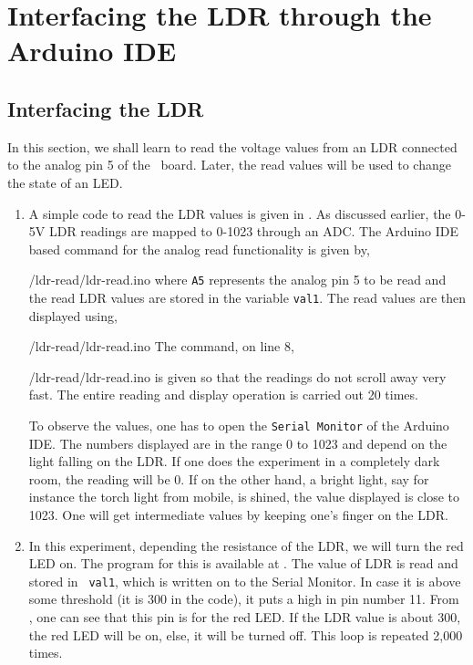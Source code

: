 \section{Interfacing the LDR through the Arduino IDE}
\subsection{Interfacing the LDR}
In this section, we shall learn to read the voltage values from an LDR
connected to the analog pin 5 of the \arduino\ board. Later, the read
values will be used to change the state of an LED.   
\begin{enumerate}
\item A simple code to read the LDR values is given in
  . As discussed earlier, the 0-5V LDR readings
  are mapped to 0-1023 through an ADC. The 
  Arduino IDE
  based command for the analog read functionality is given by,
  
  {\LocLDRardcode/ldr-read/ldr-read.ino} where {\tt A5} represents the
  analog pin 5 to be read and the read LDR values are stored in the
  variable {\tt val1}.  The read values are then displayed using,
  
  {\LocLDRardcode/ldr-read/ldr-read.ino} The command, on line 8,
  
  {\LocLDRardcode/ldr-read/ldr-read.ino} is given so that the readings
  do not scroll away very fast.  The entire reading and display
  operation is carried out 20 times.

  To observe the values, one has to open the {\tt Serial Monitor} of
  the Arduino IDE.  The numbers displayed are in the range 0 to 1023
  and depend on the light falling on the LDR.  If one does the
  experiment in a completely dark room, the reading will be 0.  If on
  the other hand, a bright light, say for instance the torch light
  from mobile, is shined, the value displayed is close to 1023.  One
  will get intermediate values by keeping one's finger on the LDR.

\item In this experiment, depending the resistance of the LDR, we will
  turn the red LED on.  The program for this is available at
  .  The value of LDR is read and stored in {\tt
    val1}, which is written on to the Serial Monitor.  In case it is
  above some threshold (it is 300 in the code), it puts a high in pin
  number 11.  From , one can see that this pin is
  for the red LED.  If the LDR value is about 300, the red LED will be
  on, else, it will be turned off.  This loop is repeated 2,000 times.
\end{enumerate}

